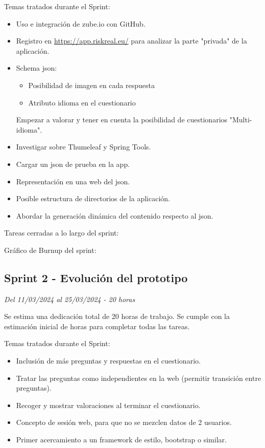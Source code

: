 Temas tratados durante el Sprint:

\begin{itemize}
	\item
	Uso e integración de zube.io con GitHub.
	\item
	Registro en \url{https://app.riskreal.eu/} para analizar la parte "privada" de la aplicación.
	\item
	Schema json:
	\begin{itemize}
		\item
		Posibilidad de imagen en cada respuesta
		\item
		Atributo idioma en el cuestionario
	\end{itemize}
	Empezar a valorar y tener en cuenta la posibilidad de cuestionarios "Multi-idioma".
	\item
	Investigar sobre Thumeleaf y Spring Tools.
	\item
	Cargar un json de prueba en la app.
	\item
	Representación en una web del json.
	\item
	Posible estructura de directorios de la aplicación.
	\item
	Abordar la generación dinámica del contenido respecto al json.
\end{itemize}

Tareas  cerradas a lo largo del sprint:

Gráfico de Burnup del sprint:


\subsection{Sprint 2 - Evolución del prototipo}
\textit{Del 11/03/2024 al 25/03/2024 - 20 horas}

Se estima una dedicación total de 20 horas de trabajo.
Se cumple con la estimación inicial de horas para completar todas las tareas.

Temas tratados durante el Sprint:

\begin{itemize}
	\item
	Inclusión de más preguntas y respuestas en el cuestionario.
	\item
	Tratar las preguntas como independientes en la web (permitir transición entre preguntas).
	\item
	Recoger y mostrar valoraciones al terminar el cuestionario.
	\item
	Concepto de sesión web, para que no se mezclen datos de 2 usuarios.
	\item
	Primer acercamiento a un framework de estilo, bootstrap o similar.
\end{itemize}

